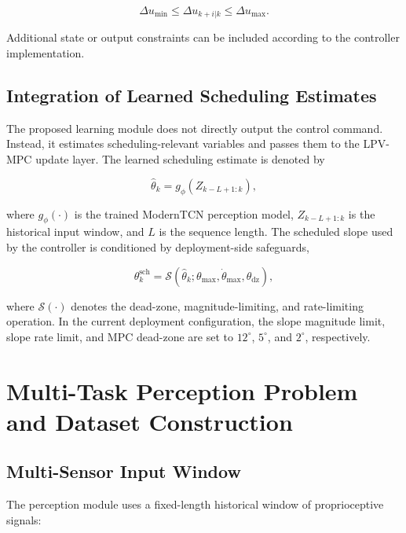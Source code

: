 \documentclass[twocolumn]{article}
\begin{document}
\begin{equation}
\Delta u_{\min} \leq \Delta u_{k+i|k} \leq \Delta u_{\max}.
\label{eq:input_rate_constraint}
\end{equation}

Additional state or output constraints can be included according to the controller implementation.

\subsection{Integration of Learned Scheduling Estimates}

The proposed learning module does not directly output the control command. Instead, it estimates scheduling-relevant variables and passes them to the LPV-MPC update layer. The learned scheduling estimate is denoted by

\begin{equation}
\hat{\theta}_k = g_{\phi}(Z_{k-L+1:k}),
\label{eq:theta_estimator}
\end{equation}

where $g_{\phi}(\cdot)$ is the trained ModernTCN perception model, $Z_{k-L+1:k}$ is the historical input window, and $L$ is the sequence length. The scheduled slope used by the controller is conditioned by deployment-side safeguards,

\begin{equation}
\theta^{\mathrm{sch}}_k =
\mathcal{S}
\left(
\hat{\theta}_k;
\theta_{\max},
\dot{\theta}_{\max},
\theta_{\mathrm{dz}}
\right),
\label{eq:slope_conditioning}
\end{equation}

where $\mathcal{S}(\cdot)$ denotes the dead-zone, magnitude-limiting, and rate-limiting operation. In the current deployment configuration, the slope magnitude limit, slope rate limit, and MPC dead-zone are set to $12^{\circ}$, $5^{\circ}$, and $2^{\circ}$, respectively.

\section{Multi-Task Perception Problem and Dataset Construction}

\label{sec:dataset}

\subsection{Multi-Sensor Input Window}

The perception module uses a fixed-length historical window of proprioceptive signals:
\end{document}
